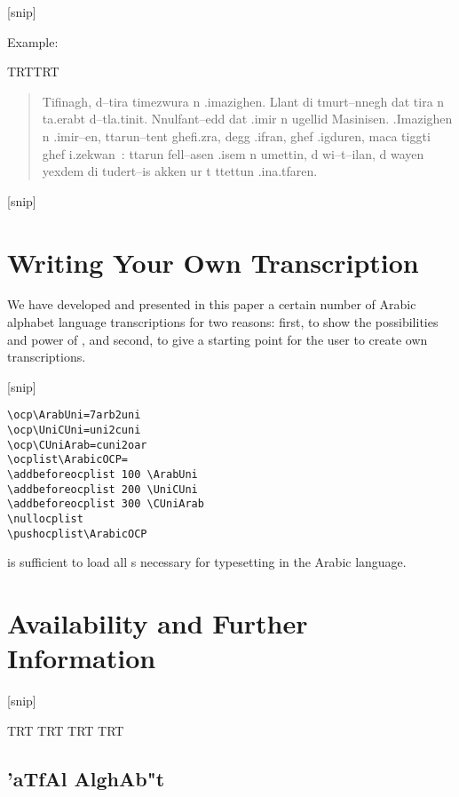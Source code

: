 \documentclass[a4paper,11pt]{article}
\begin{document}
[snip] 


\noindent
Example: 

{\pardir TRT\textdir TRT
\begin{quote}
\pushocplist\ArabicBerberOCP{}\selectfont Tifinagh,
d--tira timezwura n .imazighen.  Llant di tmurt--nnegh dat tira n
ta.erabt d--tla.tinit. Nnulfant--edd dat .imir n ugellid
Masinisen. .Imazighen n .imir--en, ttarun--tent ghefi.zra, degg
.ifran, ghef .igduren, maca tiggti ghef i.zekwan~: ttarun fell--asen
.isem n umettin, d wi--t--ilan, d wayen yexdem di tudert--is akken ur
t ttettun .ina.tfaren.  \popocplist
\end{quote}}


[snip] 


\section{Writing Your Own Transcription}\label{writingOTPs}

We have developed and presented in this paper a certain number of
Arabic alphabet language transcriptions for two reasons: first, to
show the possibilities and power of \OMEGA, and second, to give a
starting point for the user to create \hisher{} own transcriptions.

[snip] 


\begin{verbatim}
\ocp\ArabUni=7arb2uni
\ocp\UniCUni=uni2cuni
\ocp\CUniArab=cuni2oar
\ocplist\ArabicOCP=
\addbeforeocplist 100 \ArabUni
\addbeforeocplist 200 \UniCUni
\addbeforeocplist 300 \CUniArab
\nullocplist
\pushocplist\ArabicOCP
\end{verbatim}

\noindent is sufficient to load all \OTP{}s necessary for typesetting
in the Arabic language.

\section{Availability and Further Information}


[snip] 


\newpage
\pagedir TRT
\bodydir TRT
\pardir TRT
\textdir TRT
\def\latinit#1{{\fontfamily{omlgc}\selectfont\pushocplist\BasicLatinOCP%
\textdir TLT #1\popocplist}}
\def\rmdefault{omarb}
\selectfont
\pushocplist\ArabicOCP


\subsection{'aTfAl AlghAb"t}
\end{document}
